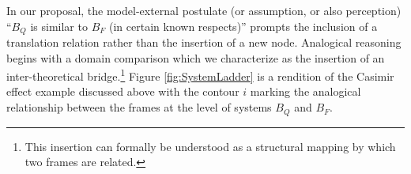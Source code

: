 \documentclass[11pt, oneside]{article}   	%
\begin{document}





In our proposal, the model-external postulate (or assumption, or also perception) ``$B_Q$ is similar to $B_F$ (in certain known respects)'' prompts the inclusion of a translation relation rather than the insertion of a new node. Analogical reasoning begins with a domain comparison which we characterize as the insertion of an inter-theoretical bridge.\footnote{This insertion can formally be understood as a structural mapping by which two frames are related.} Figure \ref{fig:SystemLadder} is a rendition of the Casimir effect example discussed above with the contour $i$ marking the analogical relationship between the frames at the level of systems $B_Q$ and $B_F$.


%
\end{document}
